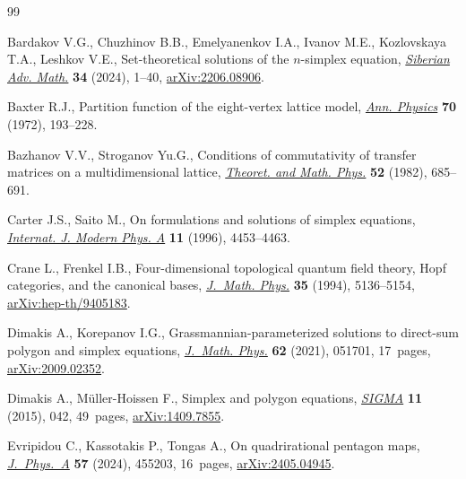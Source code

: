 \begin{thebibliography}{99}
\footnotesize\itemsep=0pt

Bardakov V.G., Chuzhinov B.B., Emelyanenkov I.A., Ivanov M.E., Kozlovskaya
 T.A., Leshkov V.E., Set-theoretical solutions of the {$n$}-simplex equation,
 \href{https://doi.org/10.1134/s1055134424010012}{\textit{Siberian Adv.
 Math.}} \textbf{34} (2024), 1--40,
 \href{https://arxiv.org/abs/2206.08906}{arXiv:2206.08906}.

Baxter R.J., Partition function of the eight-vertex lattice model,
 \href{https://doi.org/10.1016/0003-4916(72)90335-1}{\textit{Ann. Physics}}
 \textbf{70} (1972), 193--228.

Bazhanov V.V., Stroganov Yu.G., Conditions of commutativity of transfer matrices
 on a multidimensional lattice,
 \href{https://doi.org/10.1007/BF01027789}{\textit{Theoret. and Math. Phys.}}
 \textbf{52} (1982), 685--691.

Carter J.S., Saito M., On formulations and solutions of simplex equations,
 \href{https://doi.org/10.1142/S0217751X96002066}{\textit{Internat. J. Modern
 Phys. A}} \textbf{11} (1996), 4453--4463.

Crane L., Frenkel I.B., Four-dimensional topological quantum field theory,
 {H}opf categories, and the canonical bases,
 \href{https://doi.org/10.1063/1.530746}{\textit{J.~Math. Phys.}} \textbf{35}
 (1994), 5136--5154,
 \href{https://arxiv.org/abs/hep-th/9405183}{arXiv:hep-th/9405183}.

Dimakis A., Korepanov I.G., Grassmannian-parameterized solutions to direct-sum
 polygon and simplex equations,
 \href{https://doi.org/10.1063/5.0035760}{\textit{J.~Math. Phys.}} \textbf{62}
 (2021), 051701, 17~pages,
 \href{https://arxiv.org/abs/2009.02352}{arXiv:2009.02352}.

Dimakis A., M\"{u}ller-Hoissen F., Simplex and polygon equations,
 \href{https://doi.org/10.3842/SIGMA.2015.042}{\textit{SIGMA}} \textbf{11}
 (2015), 042, 49~pages,
 \href{https://arxiv.org/abs/1409.7855}{arXiv:1409.7855}.

Evripidou C., Kassotakis P., Tongas A., On quadrirational pentagon maps,
 \href{https://doi.org/10.1088/1751-8121/ad85b1}{\textit{J.~Phys.~A}}
 \textbf{57} (2024), 455203, 16~pages,
 \href{https://arxiv.org/abs/2405.04945}{arXiv:2405.04945}.


\end{thebibliography}
